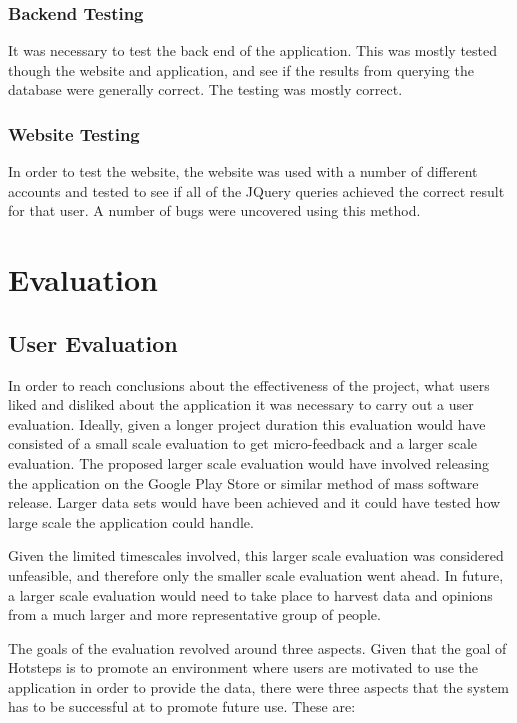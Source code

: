 \documentclass{l4proj}
\begin{document}
\subsection{Backend Testing}

It was necessary to test the back end of the application. This was mostly tested though the website and application, and see if the results from querying the database were generally correct. The testing was mostly correct.

\subsection{Website Testing}

In order to test the website, the website was used with a number of different accounts and tested to see if all of the JQuery queries achieved the correct result for that user. A number of bugs were uncovered using this method.


\chapter{Evaluation}

\section{User Evaluation}

In order to reach conclusions about the effectiveness of the project, what users liked and disliked about the application it was necessary to carry out a user evaluation. Ideally, given a longer project duration this evaluation would have consisted of a small scale evaluation to get micro-feedback and a larger scale evaluation. The proposed larger scale evaluation would have involved releasing the application on the Google Play Store or similar method of mass software release. Larger data sets would have been achieved and it could have tested how large scale the application could handle.

Given the limited timescales involved, this larger scale evaluation was considered unfeasible, and therefore only the smaller scale evaluation went ahead. In future, a larger scale evaluation would need to take place to harvest data and opinions from a much larger and more representative group of people.

The goals of the evaluation revolved around three aspects. Given that the goal of Hotsteps is to promote an environment where users are motivated to use the application in order to provide the data, there were three aspects that the system has to be successful at to promote future use. These are:
\end{document}
